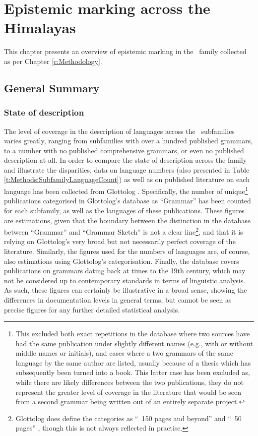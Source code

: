 \chapter{Epistemic marking across the Himalayas}\label{c:Description}
This chapter presents an overview of epistemic marking in the \lfam\ family collected as per Chapter \ref{c:Methodology}.
\section{General Summary}
\subsection{State of description}\label{ss:Description:StateOfDescription}
The level of coverage in the description of languages across the \lfam\ subfamilies varies greatly, ranging from subfamilies with over a hundred published grammars, to a number with no published comprehensive grammars, or even no published description at all. In order to compare the state of description across the family and illustrate the disparities, data on language numbers (also presented in Table \ref{t:Methods:SubfamilyLanguageCount}) as well as on published literature on each language has been collected from Glottolog \cite{glottolog}. Specifically, the number of unique\footnote{This excluded both exact repetitions in the database where two sources have had the same publication under slightly different names (e.g., with or without middle names or initials), and cases where a two grammars of the same language by the same author are listed, usually because of a thesis which has subsequently been turned into a book. This latter case has been excluded as, while there are likely differences between the two publications, they do not represent the greater level of coverage in the literature that would be seen from a second grammar being written out of an entirely separate project.} publications categorised in Glottolog's database as ``Grammar'' has been counted for each subfamily, as well as the languages of these publications. These figures are estimations, given that the boundary between the distinction in the database between ``Grammar'' and ``Grammar Sketch'' is not a clear line\footnote{Glottolog does define the categories as ``~150 pages and beyond'' and ``~50 pages'' \cite[Glossary]{glottolog}, though this is not always reflected in practise.}, and that it is relying on Glottolog's very broad but not necessarily perfect coverage of the literature. Similarly, the figures used for the numbers of languages are, of course, also estimations using Glottolog's categorisation. Finally, the database covers publications on grammars dating back at times to the 19th century, which may not be considered up to contemporary standards in terms of linguistic analysis. As such, these figures can certainly be illustrative in a broad sense, showing the differences in documentation levels in general terms, but cannot be seen as precise figures for any further detailed statistical analysis.

